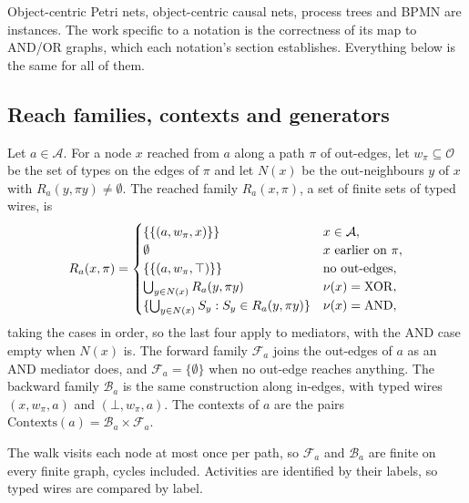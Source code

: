 Object-centric Petri nets, object-centric causal nets, process trees and BPMN are instances.
The work specific to a notation is the correctness of its map to AND/OR graphs, which each
notation's section establishes. Everything below is the same for all of them.

\subsection{Reach families, contexts and generators}
\label{subsec:generators}

\begin{definition}
  \label{def:contexts-general}
  Let $a\in\mathcal{A}$. For a node $x$ reached from $a$ along a path $\pi$ of out-edges, let
  $w_\pi\subseteq\mathcal{O}$ be the set of types on the edges of $\pi$ and let $N(x)$ be the
  out-neighbours $y$ of $x$ with $R_a(y,\pi y)\ne\emptyset$. The reached family $R_a(x,\pi)$, a set of
  finite sets of typed wires, is
  \begin{gather*}
    R_a(x,\pi)=
    \begin{cases}
      \{\{(a,w_\pi,x)\}\} & x\in\mathcal{A},\\
      \emptyset & x\text{ earlier on }\pi,\\
      \{\{(a,w_\pi,\top)\}\} & \text{no out-edges},\\
      \textstyle\bigcup_{y\in N(x)}R_a(y,\pi y) & \nu(x)=\mathrm{XOR},\\
      \{\textstyle\bigcup_{y\in N(x)}S_y : S_y\in R_a(y,\pi y)\} & \nu(x)=\mathrm{AND},
    \end{cases}
  \end{gather*}
  taking the cases in order, so the last four apply to mediators, with the AND case empty when
  $N(x)$ is. The forward family $\mathcal{F}_a$ joins the out-edges of
  $a$ as an AND mediator does, and $\mathcal{F}_a=\{\emptyset\}$ when no out-edge reaches anything.
  The backward family $\mathcal{B}_a$ is the same construction along in-edges, with typed wires
  $(x,w_\pi,a)$ and $(\bot,w_\pi,a)$. The contexts of $a$ are the pairs
  $\mathrm{Contexts}(a)=\mathcal{B}_a\times\mathcal{F}_a$.
\end{definition}

The walk visits each node at most once per path, so $\mathcal{F}_a$ and $\mathcal{B}_a$ are
finite on every finite graph, cycles included. Activities are identified by their labels, so
typed wires are compared by label.

